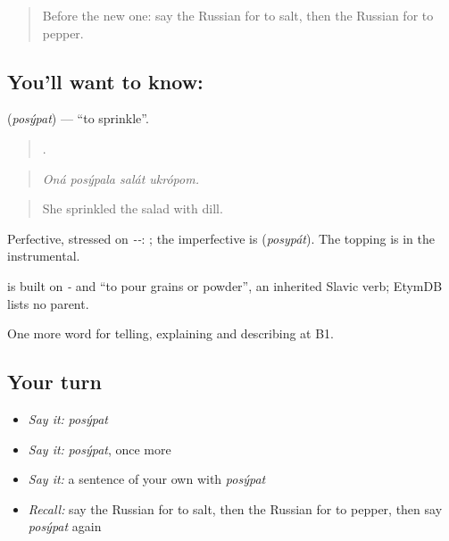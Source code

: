 \label{lesson:RU-C333-posypat}



\begin{quote}
Before the new one: say the Russian for to salt, then the Russian for to pepper.
\end{quote}

\subsection*{You'll want to know: }
\textbf{} (\emph{posýpat}) — \textquotedblleft{}to sprinkle\textquotedblright{}.

\begin{quote}
   .
\end{quote}

\begin{quote}
\emph{Oná posýpala salát ukrópom.}
\end{quote}

\begin{quote}
She sprinkled the salad with dill.
\end{quote}

Perfective, stressed on \emph{--}: \emph{}; the imperfective is \emph{} (\emph{posypát}). The topping is in the instrumental.

\begin{cousinweb}
\emph{} is built on \emph{-} and \emph{} \textquotedblleft{}to pour grains or powder\textquotedblright{}, an inherited Slavic verb; EtymDB lists no parent.
\end{cousinweb}

\begin{grammarlens}[title={What you've built}]
One more word for telling, explaining and describing at B1.
\end{grammarlens}

\subsection*{Your turn}
\begin{itemize}
\raggedright
  \item \emph{Say it:} \emph{posýpat}
  \item \emph{Say it:} \emph{posýpat}, once more
  \item \emph{Say it:} a sentence of your own with \emph{posýpat}
  \item \emph{Recall:} say the Russian for to salt, then the Russian for to pepper, then say \emph{posýpat} again
\end{itemize}

